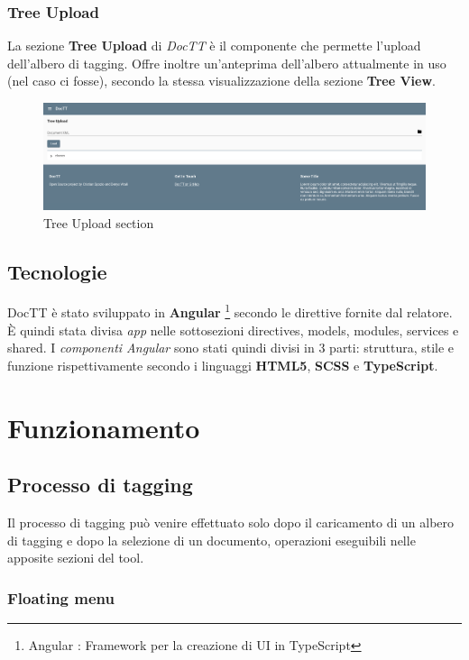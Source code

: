 \documentclass[twoside]{supsistudent}
\begin{document}
\pagebreak

\subsection{Tree Upload}
La sezione \textbf{Tree Upload} di \textit{DocTT} è il componente che permette
l'upload dell'albero di tagging. Offre inoltre un'anteprima dell'albero 
attualmente in uso (nel caso ci fosse), secondo la stessa visualizzazione 
della sezione \textbf{Tree View}.
 
\begin{figure}[h!]
  \includegraphics[width=\linewidth]{figures/treeUpload.png}
  \caption{Tree Upload section}
  \label{fig:treeUpload}
\end{figure}

\section{Tecnologie}
DocTT è stato sviluppato in \textbf{Angular}
\footnote{Angular : Framework per la creazione di UI in TypeScript}
secondo le direttive fornite dal relatore. È quindi stata divisa \textit{app}
nelle sottosezioni directives, models, modules, services e shared. I 
\textit{componenti Angular} sono stati quindi divisi in 3 parti: struttura, 
stile e funzione rispettivamente secondo i linguaggi \textbf{HTML5}, 
\textbf{SCSS} e \textbf{TypeScript}.

\chapter{Funzionamento}

\section{Processo di tagging}

Il processo di tagging può venire effettuato solo dopo il caricamento di un 
albero di tagging e dopo la selezione di un documento, operazioni eseguibili
nelle apposite sezioni del tool. 

\subsection{Floating menu}
\end{document}
